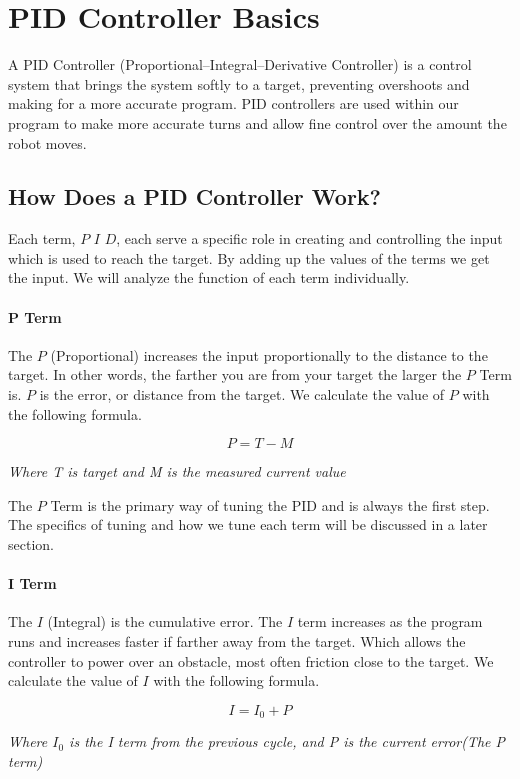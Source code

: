 \documentclass[12pt]{report}
\begin{document}
\section{PID Controller Basics}
    A PID Controller (Proportional–Integral–Derivative Controller) is a control system that brings the system softly to a target,
        preventing overshoots and making for a more accurate program. 
    PID controllers are used within our program to make more accurate turns and allow fine control over the amount the robot moves.

\subsection{How Does a PID Controller Work?} \label{howPID}
    Each term, $P$ $I$ $D$, each serve a specific role in creating and controlling the input which is used to reach the target. 
    By adding up the values of the terms we get the input. We will analyze the function of each term individually.

\paragraph{P Term}
    The $P$ (Proportional) increases the input proportionally to the distance to the target.
    In other words, the farther you are from your target the larger the $P$ Term is. 
    $P$ is the error, or distance from the target. We calculate the value of $P$ with the following formula.

    $$ P = T - M$$
    \begin{center}\em{Where T is target and M is the measured current value}\end{center}

    The $P$ Term is the primary way of tuning the PID and is always the first step.
    The specifics of tuning and how we tune each term will be discussed in a later section.

\paragraph{I Term}
    The $I$ (Integral) is the cumulative error.
    The $I$ term increases as the program runs and increases faster if farther away from the target. 
    Which allows the controller to power over an obstacle, most often friction close to the target.
    We calculate the value of $I$ with the following formula.

    $$ I = I_0 + P$$
    \begin{center}\em{Where $I_0$ is the I term from the previous cycle, and P is the current error(The P term)}\end{center}
\end{document}
